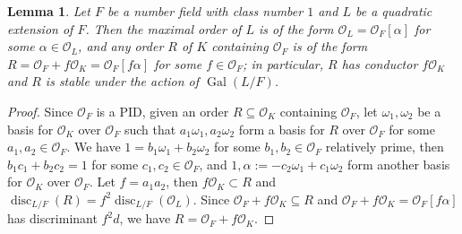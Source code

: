 \documentclass{amsart}
\numberwithin{equation}{subsection}
\numberwithin{theorem}{section}
\newtheorem{lemma}[theorem]{Lemma}
\theoremstyle{definition}
\theoremstyle{remark}
\newcommand{\cO}{\mathcal{O}}
\DeclareMathOperator{\disc}{disc}
\DeclareMathOperator{\Gal}{Gal}
\begin{document}
\begin{lemma}
    Let $F$ be a number field with class number $1$ and $L$ be a quadratic extension of $F$. Then the maximal order of $L$ is of the form $\cO_L = \cO_F[\alpha]$ for some $\alpha \in \cO_L$, and any order $R$ of $K$ containing $\cO_F$ is of the form $R = \cO_F + f \cO_K = \cO_F [f\alpha]$ for some $f\in \cO_F$; in particular, $R$ has conductor $f\cO_K$ and $R$ is stable under the action of $\Gal(L/F)$.
\end{lemma}
\begin{proof}
    Since $\cO_F$ is a PID, given an order $R\subseteq \cO_K$ containing $\cO_F$, let $\omega_1, \omega_2$ be a basis for $\cO_K$ over $\cO_F$ such that $a_1\omega_1, a_2\omega_2$ form a basis for $R$ over $\cO_F$ for some $a_1, a_2\in \cO_F$.  We have $1 = b_1\omega_1+b_2\omega_2$ for some $b_1, b_2\in \cO_F$ relatively prime, then $b_1c_1 + b_2c_2 = 1$ for some $c_1, c_2\in \cO_F$, and $1, \alpha:= -c_2\omega_1+c_1\omega_2$ form another basis for $\cO_K$ over $\cO_F$. 
    Let $f = a_1a_2$, then $f \cO_K \subset R$ and $\disc_{L/F}(R) = f^2\disc_{L/F}(\cO_L)$.
    Since $\cO_F + f\cO_K \subseteq R$ and $\cO_F+f\cO_K = \cO_F[f\alpha]$ has discriminant $f^2 d$, we have $R = \cO_F + f\cO_K$.
\end{proof}
\end{document}

